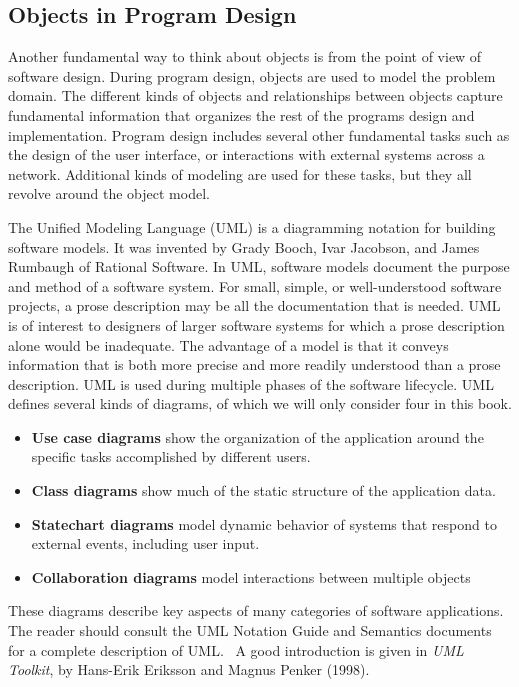 \subsection[Objects in Program Design]{Objects in Program Design}
Another fundamental way to think about objects is
from the point of view of software design. During program design,
objects are used to model the problem domain. The different kinds of
objects and relationships between objects capture fundamental
information that organizes the rest of the program{\textquotesingle}s
design and implementation. Program design includes several other
fundamental tasks such as the design of the user interface, or
interactions with external systems across a network. Additional kinds
of modeling are used for these tasks, but they all revolve around the
object model.

The Unified Modeling Language (UML) is a diagramming notation
for building software models. It was invented by Grady Booch, Ivar
Jacobson, and James Rumbaugh of Rational Software. In UML, software
models document the purpose and method of a software system. For small,
simple, or well-understood software projects, a prose description may
be all the documentation that is needed. UML is of interest to
designers of larger software systems for which a prose description
alone would be inadequate. The advantage of a model is that it conveys
information that is both more precise and more readily understood than
a prose description. UML is used during multiple phases of the software
lifecycle. UML defines several kinds of diagrams, of which we will only
consider four in this book.

\begin{itemize}
\item \textbf{Use case diagrams} show the organization of the
application around the specific tasks accomplished by different users.
\item \textbf{Class diagrams} show much of the static structure of the
application data.
\item \textbf{Statechart diagrams} model dynamic behavior of systems
that respond to external events, including user input.
\item \textbf{Collaboration diagrams} model interactions between
multiple objects
\end{itemize}
These diagrams describe key aspects of many categories of software
applications. The reader should consult the UML Notation Guide and
Semantics documents for a complete description of UML. \ A good
introduction is given in \textit{UML Toolkit}, by Hans-Erik Eriksson
and Magnus Penker (1998).

